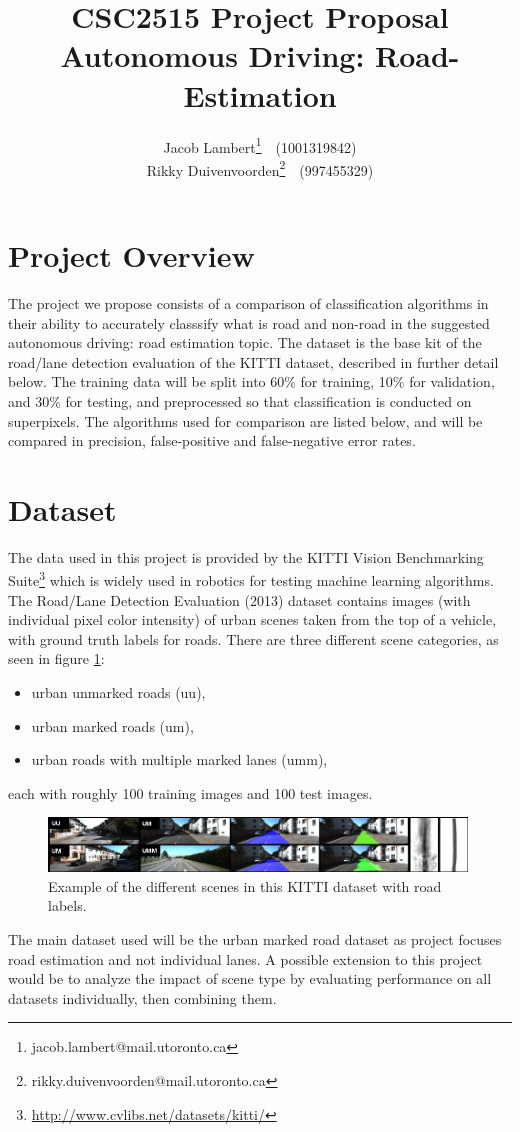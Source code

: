 \documentclass[a4paper,10pt]{article}
\title{\textbf{CSC2515 Project Proposal} \\
Autonomous Driving: Road-Estimation}
\author{
  Jacob Lambert\footnote{jacob.lambert@mail.utoronto.ca}~~(1001319842)\\
  Rikky Duivenvoorden\footnote{rikky.duivenvoorden@mail.utoronto.ca}~~(997455329) \\
}
\date{}
\begin{document}
\maketitle

\section{Project Overview}
The project we propose consists of a comparison of classification algorithms in their ability to accurately classsify what is road and non-road in the suggested autonomous driving: road estimation topic. The dataset is the base kit of the road/lane detection evaluation of the KITTI dataset, described in further detail below. The training data will be split into 60\% for training, 10\% for validation, and 30\% for testing, and preprocessed so that classification is conducted on superpixels. The algorithms used for comparison are listed below, and will be compared in precision, false-positive and false-negative error rates.


\section{Dataset}
The data used in this project is provided by the KITTI Vision Benchmarking Suite\footnote{ \url{http://www.cvlibs.net/datasets/kitti/}} which is widely used in robotics for testing machine learning algorithms. The Road/Lane Detection Evaluation (2013) dataset contains images (with individual pixel color intensity) of urban scenes taken from the top of a vehicle, with ground truth labels for roads. There are three different scene categories, as seen in figure \ref{fig:kitti}:
\begin{itemize}
 \item urban unmarked roads (uu),
 \item urban marked roads (um),
 \item urban roads with multiple marked lanes (umm),
\end{itemize}
each with roughly 100 training images and 100 test images.
\begin{figure}[ht!]
 \centering
 \includegraphics[width=0.99\textwidth]{figs/kitti.jpg}
 \caption{Example of the different scenes in this KITTI dataset with road labels.}\label{fig:kitti}
\end{figure}
The main dataset used will be the urban marked road dataset as project focuses road estimation and not individual lanes. A possible extension to this project would be to analyze the impact of scene type by evaluating performance on all datasets individually, then combining them.
\end{document}
